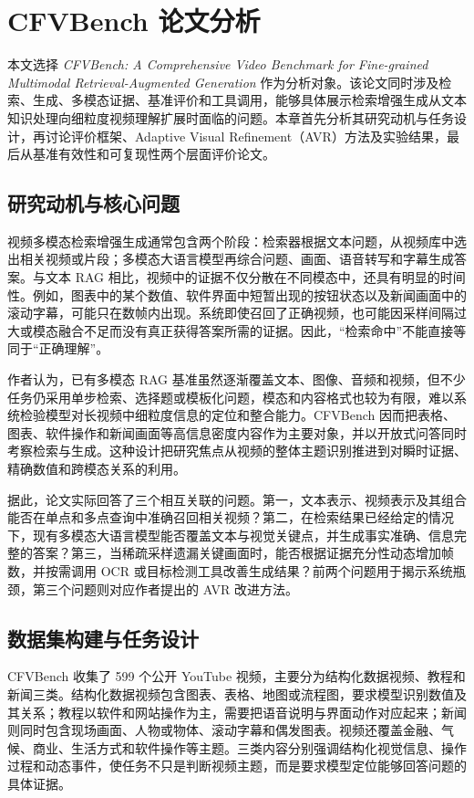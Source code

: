 \section{CFVBench 论文分析}

本文选择 \emph{CFVBench: A Comprehensive Video Benchmark for Fine-grained Multimodal Retrieval-Augmented Generation}\parencite{wei2026cfvbench} 作为分析对象。该论文同时涉及检索、生成、多模态证据、基准评价和工具调用，能够具体展示检索增强生成从文本知识处理向细粒度视频理解扩展时面临的问题。本章首先分析其研究动机与任务设计，再讨论评价框架、Adaptive Visual Refinement（AVR）方法及实验结果，最后从基准有效性和可复现性两个层面评价论文。

\subsection{研究动机与核心问题}

视频多模态检索增强生成通常包含两个阶段：检索器根据文本问题，从视频库中选出相关视频或片段；多模态大语言模型再综合问题、画面、语音转写和字幕生成答案。与文本 RAG 相比，视频中的证据不仅分散在不同模态中，还具有明显的时间性。例如，图表中的某个数值、软件界面中短暂出现的按钮状态以及新闻画面中的滚动字幕，可能只在数帧内出现。系统即使召回了正确视频，也可能因采样间隔过大或模态融合不足而没有真正获得答案所需的证据。因此，“检索命中”不能直接等同于“正确理解”。

作者认为，已有多模态 RAG 基准虽然逐渐覆盖文本、图像、音频和视频，但不少任务仍采用单步检索、选择题或模板化问题，模态和内容格式也较为有限，难以系统检验模型对长视频中细粒度信息的定位和整合能力。CFVBench 因而把表格、图表、软件操作和新闻画面等高信息密度内容作为主要对象，并以开放式问答同时考察检索与生成\parencite{wei2026cfvbench}。这种设计把研究焦点从视频的整体主题识别推进到对瞬时证据、精确数值和跨模态关系的利用。

据此，论文实际回答了三个相互关联的问题。第一，文本表示、视频表示及其组合能否在单点和多点查询中准确召回相关视频？第二，在检索结果已经给定的情况下，现有多模态大语言模型能否覆盖文本与视觉关键点，并生成事实准确、信息完整的答案？第三，当稀疏采样遗漏关键画面时，能否根据证据充分性动态增加帧数，并按需调用 OCR 或目标检测工具改善生成结果？前两个问题用于揭示系统瓶颈，第三个问题则对应作者提出的 AVR 改进方法。

\subsection{数据集构建与任务设计}

CFVBench 收集了 599 个公开 YouTube 视频，主要分为结构化数据视频、教程和新闻三类。结构化数据视频包含图表、表格、地图或流程图，要求模型识别数值及其关系；教程以软件和网站操作为主，需要把语音说明与界面动作对应起来；新闻则同时包含现场画面、人物或物体、滚动字幕和偶发图表。视频还覆盖金融、气候、商业、生活方式和软件操作等主题。三类内容分别强调结构化视觉信息、操作过程和动态事件，使任务不只是判断视频主题，而是要求模型定位能够回答问题的具体证据\parencite{wei2026cfvbench}。

